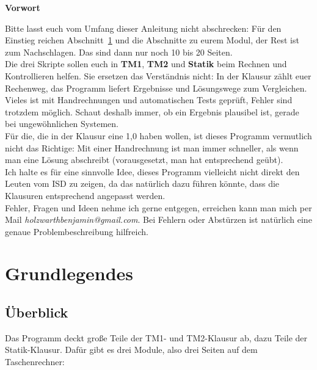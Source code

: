 \begin{center}
\begin{minipage}{0.9\linewidth}
\color{red}
\textbf{Vorwort}\par\smallskip
Bitte lasst euch vom Umfang dieser Anleitung nicht abschrecken: Für den Einstieg
reichen Abschnitt~\ref{sec:grundlegendes} und die Abschnitte zu eurem Modul, der Rest ist zum
Nachschlagen. Das sind dann nur noch 10 bis 20 Seiten.\\
Die drei Skripte sollen euch in \textbf{TM1}, \textbf{TM2} und \textbf{Statik} beim Rechnen und
Kontrollieren helfen. Sie ersetzen das Verständnis nicht: In der Klausur zählt euer Rechenweg, das
Programm liefert Ergebnisse und Lösungswege zum Vergleichen. Vieles ist mit Handrechnungen und
automatischen Tests geprüft, Fehler sind trotzdem möglich. Schaut deshalb immer, ob ein Ergebnis
plausibel ist, gerade bei ungewöhnlichen Systemen.\\
Für die, die in der Klausur eine 1,0 haben wollen, ist dieses Programm vermutlich nicht das Richtige:
Mit einer Handrechnung ist man immer schneller, als wenn man eine Lösung abschreibt (vorausgesetzt,
man hat entsprechend geübt).\\
Ich halte es für eine sinnvolle Idee, dieses Programm vielleicht nicht direkt den Leuten vom ISD zu zeigen,
da das natürlich dazu führen könnte, dass die Klausuren entsprechend angepasst werden.\\
Fehler, Fragen und Ideen nehme ich gerne entgegen, erreichen kann man mich per Mail \emph{holzwarthbenjamin@gmail.com}.
Bei Fehlern oder Abstürzen ist natürlich eine genaue Problembeschreibung hilfreich.
\end{minipage}
\end{center}

\tableofcontents
\newpage

\section{Grundlegendes}\label{sec:grundlegendes}

\subsection{Überblick}

Das Programm deckt große Teile der TM1- und TM2-Klausur ab, dazu Teile der Statik-Klausur. Dafür
gibt es drei Module, also drei Seiten auf dem Taschenrechner:

